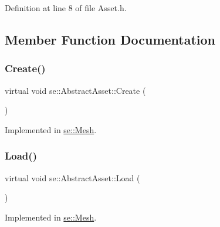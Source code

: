 Definition at line 8 of file Asset.\+h.



\subsection{Member Function Documentation}
\mbox{\label{classse_1_1_abstract_asset_ae3f9fb8f5c26ac8ea511e8e21f5bd624}} 
\subsubsection{\texorpdfstring{Create()}{Create()}}
{\footnotesize\ttfamily virtual void se\+::\+Abstract\+Asset\+::\+Create (\begin{DoxyParamCaption}{ }\end{DoxyParamCaption})\hspace{0.3cm}{\ttfamily [pure virtual]}}



Implemented in \mbox{\hyperlink{classse_1_1_mesh_a56e2d07f7b642c16e89631796a0d576e}{se\+::\+Mesh}}.

\mbox{\label{classse_1_1_abstract_asset_afb4dff418acf169d81b6ca5d8c1f6548}} 
\subsubsection{\texorpdfstring{Load()}{Load()}}
{\footnotesize\ttfamily virtual void se\+::\+Abstract\+Asset\+::\+Load (\begin{DoxyParamCaption}{ }\end{DoxyParamCaption})\hspace{0.3cm}{\ttfamily [pure virtual]}}



Implemented in \mbox{\hyperlink{classse_1_1_mesh_a17116983a6c6e73770585b72332c5140}{se\+::\+Mesh}}.

\mbox{\label{classse_1_1_abstract_asset_a1f2fdf75bbeaddec16dc4778063505b7}} 
